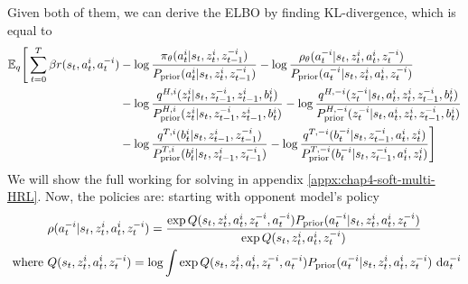 Given both of them, we can derive the ELBO by finding KL-divergence, which is equal to 
\begin{equation}
\begin{aligned}
    \mathbb{E}_q\Bigg[\sum^T_{t=0}\beta r(s_t, a_t^i, a^{-i}_t) &- \log\frac{\pi_\theta(a^i_t | s_t, z^i_t, z^{-i}_{t-1})}{P_{\text{prior}}(a^i_t | s_t, z^i_t, z^{-i}_{t-1})} - \log\frac{\rho_\theta(a^{-i}_t | s_t, z^i_t, a^i_t, z^{-i}_t) }{P_{\text{prior}}(a^{-i}_t | s_t, z^i_t, a^i_t, z^{-i}_t)} \\
    &- \log\frac{q^{H, i}(z^i_t | s_t, z^{-i}_{t-1}, z^i_{t-1}, b^i_t)}{P^{H, i}_{\text{prior}}(z^i_t | s_t, z^{-i}_{t-1}, z^i_{t-1}, b^i_t)} - \log\frac{q^{H, -i}(z^{-i}_t | s_t, a^i_t, z^i_t, z^{-i}_{t-1}, b^i_t)}{P^{H, -i}_{\text{prior}}(z^{-i}_t | s_t, a^i_t, z^i_t, z^{-i}_{t-1}, b^i_t)} \\
    &- \log\frac{q^{T,i}(b^i_t | s_t, z^i_{t-1}, z^{-i}_{t-1})}{P^{T,i}_{\text{prior}}(b^i_t | s_t, z^i_{t-1}, z^{-i}_{t-1})} - \log\frac{q^{T,-i}(b^{-i}_t | s_t,  z^{-i}_{t-1}, a^i_t, z^i_t)}{P^{T,-i}_{\text{prior}}(b^{-i}_t | s_t,  z^{-i}_{t-1}, a^i_t, z^i_t) } \Bigg]
\end{aligned}
\end{equation}
We will show the full working for solving in appendix \ref{appx:chap4-soft-multi-HRL}. Now, the policies are: starting with opponent model's policy 
\begin{equation*}
\begin{aligned}
    &\rho(a^{-i}_t | s_t, z^i_t, a^{i}_t, z^{-i}_t) = \frac{\exp Q(s_t, z^i_t, a^{i}_t, z^{-i}_t, a^{-i}_t) P_{\text{prior}}(a^{-i}_t | s_t, z^i_t, a^{i}_t, z^{-i}_t)}{\exp Q(s_t, z^i_t, a^{i}_t, z^{-i}_t)} \\
    \text{ where } &Q(s_t, z^i_t, a^{i}_t, z^{-i}_t) = \log \int \exp Q(s_t, z^i_t, a^{i}_t, z^{-i}_t, a^{-i}_t) P_{\text{prior}}(a^{-i}_t | s_t, z^i_t, a^{i}_t, z^{-i}_t) \ \mathrm{d} a^{-i}_t
\end{aligned}
\end{equation*}
